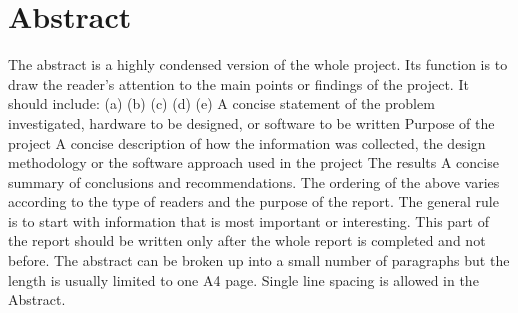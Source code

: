 
\chapter*{Abstract}

The abstract is a highly condensed version of the whole project. Its function is to draw the
reader's attention to the main points or findings of the project. It should include:
(a)
(b)
(c)
(d)
(e)
A concise statement of the problem investigated, hardware to be designed, or
software to be written
Purpose of the project
A concise description of how the information was collected, the design methodology
or the software approach used in the project
The results
A concise summary of conclusions and recommendations.
The ordering of the above varies according to the type of readers and the purpose of the
report. The general rule is to start with information that is most important or interesting. This
part of the report should be written only after the whole report is completed and not before.
The abstract can be broken up into a small number of paragraphs but the length is usually
limited to one A4 page. Single line spacing is allowed in the Abstract.



